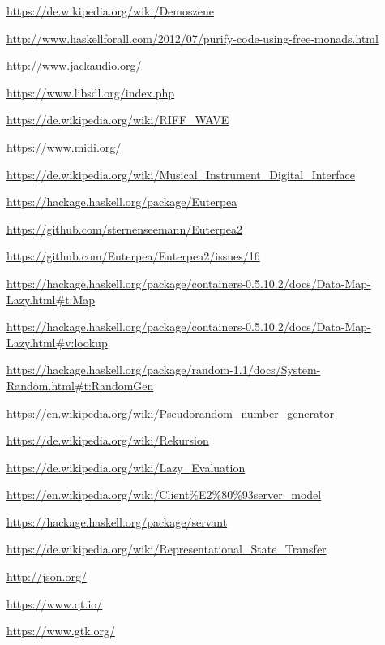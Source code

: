 \documentclass[a4paper,twocolumn]{article}
\begin{document}
\begin{thebibliography}{9}
  \url{https://de.wikipedia.org/wiki/Demoszene}

  \url{http://www.haskellforall.com/2012/07/purify-code-using-free-monads.html}

  \url{http://www.jackaudio.org/}

  \url{https://www.libsdl.org/index.php}

  \url{https://de.wikipedia.org/wiki/RIFF_WAVE}

  \url{https://www.midi.org/}

  \url{https://de.wikipedia.org/wiki/Musical_Instrument_Digital_Interface}

  \url{https://hackage.haskell.org/package/Euterpea}

  \url{https://github.com/sternenseemann/Euterpea2}

  \url{https://github.com/Euterpea/Euterpea2/issues/16}

  \url{https://hackage.haskell.org/package/containers-0.5.10.2/docs/Data-Map-Lazy.html#t:Map}

  \url{https://hackage.haskell.org/package/containers-0.5.10.2/docs/Data-Map-Lazy.html#v:lookup}

  \url{https://hackage.haskell.org/package/random-1.1/docs/System-Random.html#t:RandomGen}

  \url{https://en.wikipedia.org/wiki/Pseudorandom_number_generator}

  \url{https://de.wikipedia.org/wiki/Rekursion}

  \url{https://de.wikipedia.org/wiki/Lazy_Evaluation}

  \url{https://en.wikipedia.org/wiki/Client%E2%80%93server_model}

  \url{https://hackage.haskell.org/package/servant}

  \url{https://de.wikipedia.org/wiki/Representational_State_Transfer}

  \url{http://json.org/}

  \url{https://www.qt.io/}

  \url{https://www.gtk.org/}


\end{thebibliography}
\end{document}
